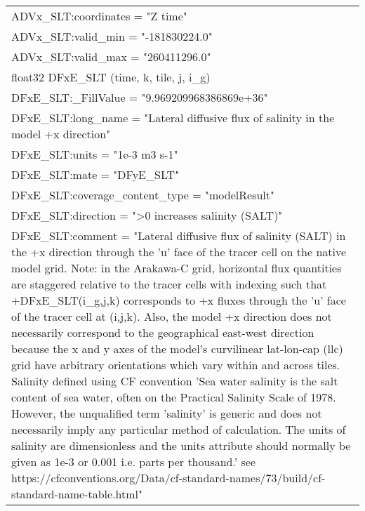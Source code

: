 \begin{longtable}{|p{\textwidth}|}
\hspace{0.5cm}\hspace{0.5cm}ADVx\_SLT:coordinates = "Z time"\\
\hspace{0.5cm}\hspace{0.5cm}ADVx\_SLT:valid\_min = "-181830224.0"\\
\hspace{0.5cm}\hspace{0.5cm}ADVx\_SLT:valid\_max = "260411296.0"\\
\hspace{0.5cm}float32 DFxE\_SLT (time, k, tile, j, i\_g)\\
\hspace{0.5cm}\hspace{0.5cm}DFxE\_SLT:\_FillValue = "9.969209968386869e+36"\\
\hspace{0.5cm}\hspace{0.5cm}DFxE\_SLT:long\_name = "Lateral diffusive flux of salinity in the model +x direction"\\
\hspace{0.5cm}\hspace{0.5cm}DFxE\_SLT:units = "1e-3 m3 s-1"\\
\hspace{0.5cm}\hspace{0.5cm}DFxE\_SLT:mate = "DFyE\_SLT"\\
\hspace{0.5cm}\hspace{0.5cm}DFxE\_SLT:coverage\_content\_type = "modelResult"\\
\hspace{0.5cm}\hspace{0.5cm}DFxE\_SLT:direction = ">0 increases salinity (SALT)"\\
\hspace{0.5cm}\hspace{0.5cm}DFxE\_SLT:comment = "Lateral diffusive flux of salinity (SALT) in the +x direction through the 'u' face of the tracer cell on the native model grid. Note: in the Arakawa-C grid, horizontal flux quantities are staggered relative to the tracer cells with indexing such that +DFxE\_SLT(i\_g,j,k) corresponds to +x fluxes through the 'u' face of the tracer cell at (i,j,k). Also, the model +x direction does not necessarily correspond to the geographical east-west direction because the x and y axes of the model's curvilinear lat-lon-cap (llc) grid have arbitrary orientations which vary within and across tiles. Salinity defined using CF convention 'Sea water salinity is the salt content of sea water, often on the Practical Salinity Scale of 1978. However, the unqualified term 'salinity' is generic and does not necessarily imply any particular method of calculation. The units of salinity are dimensionless and the units attribute should normally be given as 1e-3 or 0.001 i.e. parts per thousand.' see https://cfconventions.org/Data/cf-standard-names/73/build/cf-standard-name-table.html"\\

\end{longtable}
